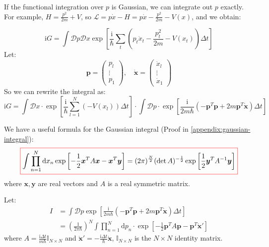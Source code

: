 If the functional integration over $p$ is Gaussian, we can integrate out $p$ exactly. For example, $H = \frac{p^2}{2m} + V$,
so $\mathcal{L} = p\dot{x} - H = p\dot{x} - \frac{p^2}{2m} - V(x)$, and we obtain:

\begin{equation}
\mathrm{i}G = \int \mathcal{D}p \mathcal{D}x \exp \left[ \frac{\mathrm{i}}{\hbar} \sum_t \left( p_t \dot{x}_t - \frac{p_t^2}{2m} - V(x_t) \right) \Delta t \right]
\end{equation}
Let:
\begin{equation}
\bm{p} = \begin{pmatrix} p_l \\ \vdots \\ p_1 \end{pmatrix}, \quad \dot{\bm{x}} = \begin{pmatrix} \dot{x}_l \\ \vdots \\ \dot{x}_1 \end{pmatrix}
\end{equation}
So we can rewrite the integral as:
\begin{equation}
\mathrm{i}G = \int \mathcal{D}x \cdot \exp \left[ \frac{\mathrm{i}}{\hbar} \sum_{l = 1}^{N} (-V(x_l)) \Delta t \right] \cdot 
\int \mathcal{D}p \cdot \exp \left[ \frac{\mathrm{i}}{2m\hbar} (-\bm{p}^T \bm{p} + 2m \bm{p}^T \dot{\bm{x}}) \Delta t \right]
\end{equation}

We have a useful formula for the Gaussian integral (Proof in \ref{appendix:gaussian-integral}):
\begin{equation}
    \colorboxed{
    \int \prod_{n = 1}^{N} \mathrm{d}x_n \exp \left[ -\frac{1}{2}\bm{x}^T A \bm{x} - \bm{x}^T \bm{y} \right] 
    = (2\pi)^{\frac{N}{2}} (\det A)^{-\frac{1}{2}} \exp \left[ \frac{1}{2} \bm{y}^T A^{-1} \bm{y} \right]
    }
\end{equation}
where $\bm{x}, \bm{y}$ are real vectors and $A$ is a real symmetric matrix.

Let:
\begin{equation}
    \begin{aligned}
    I &= \int \mathcal{D}p \exp \left[ \frac{\mathrm{i}}{2m\hbar} (-\bm{p}^T \bm{p} + 2m \bm{p}^T \dot{\bm{x}})\Delta t \right] \\
    &= \left( \frac{1}{2\pi\hbar} \right)^N \int \prod_{n = 1}^{N} \mathrm{d}p_n \cdot \exp \left[ -\frac{1}{2} \bm{p}^T A \bm{p} 
    - \bm{p}^T \dot{\bm{x}}' \right]
    \end{aligned}
\end{equation}
where $A = \frac{\mathrm{i}\Delta t}{m\hbar} \mathbb{I}_{N \times N}$ and $ \dot{\bm{x}}' = -\frac{\mathrm{i}\Delta t}{\hbar} \dot{\bm{x}}$, 
$\mathbb{I}_{N \times N}$ is the $N \times N$ identity matrix.

